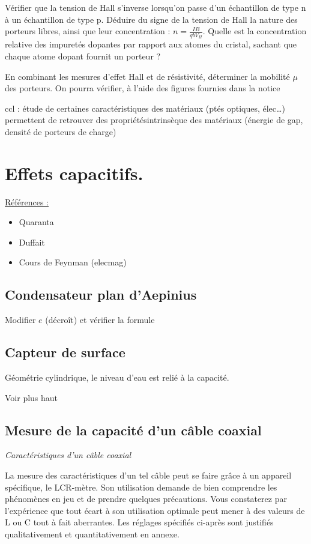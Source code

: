 \documentclass{article}%
\begin{document}
Vérifier que la tension de Hall s'inverse lorsqu'on passe d'un échantillon de type n à un échantillon de type p.
Déduire du signe de la tension de Hall la nature des porteurs libres, ainsi que leur concentration :
$ n = \frac{I B}{qbV_{H} }$.
Quelle est la concentration relative des impuretés dopantes par rapport aux atomes du cristal, sachant que chaque atome dopant fournit un porteur ?

En combinant les mesures d'effet Hall et de résistivité, déterminer la mobilité $\mu$ des porteurs. On pourra vérifier, à l'aide des figures fournies dans la notice

ccl : étude de certaines caractéristiques des matériaux (ptés optiques, élec\dots) permettent de retrouver des propriétésintrinsèque des matériaux (énergie de gap, densité de porteurs de charge)
\section{Effets capacitifs.}
\underline{Références :}
\begin{itemize}
	\item Quaranta
	\item Duffait
	\item Cours de Feynman (elecmag)
\end{itemize}
\subsection{Condensateur plan d'Aepinius}
Modifier $e$ (décroît) et vérifier la formule


\subsection{Capteur de surface}
Géométrie cylindrique, le niveau d'eau est relié à la capacité.

Voir plus haut
\subsection{Mesure de la capacité d'un câble coaxial}

\textit{Caractéristiques d'un câble coaxial}

La mesure des caractéristiques d'un tel câble peut se faire grâce à un appareil spécifique, le LCR-mètre. Son utilisation demande de bien comprendre les phénomènes en jeu et de prendre quelques précautions. Vous constaterez par l'expérience que tout écart à son utilisation optimale peut mener à des valeurs de L ou C tout à fait aberrantes. Les réglages spécifiés ci-après sont justifiés qualitativement et quantitativement en annexe.
\end{document}
